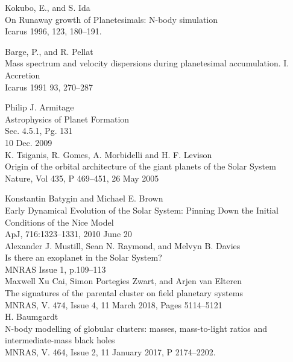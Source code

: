 \documentclass[a4paper,10pt]{article}
\begin{document}
\begin{thebibliography}{9}

Kokubo, E., and S. Ida\\
On Runaway growth of Planetesimals: N-body simulation\\ 
Icarus 1996, 123, 180--191.

Barge, P., and R. Pellat\\ 
Mass spectrum and velocity dispersions during planetesimal accumulation. I. Accretion\\
Icarus 1991 93, 270--287

Philip J. Armitage\\
Astrophysics of Planet Formation\\
Sec. 4.5.1, Pg. 131\\
10 Dec. 2009\\

K. Tsiganis, R. Gomes, A. Morbidelli and H. F. Levison\\
Origin of the orbital architecture of the giant planets of the Solar System\\ 
Nature, Vol 435, P 469--451, 26 May 2005

Konstantin Batygin and Michael E. Brown\\
Early Dynamical Evolution of the Solar System: Pinning Down the Initial Conditions of the Nice Model\\
 ApJ, 716:1323--1331, 2010 June 20\\

Alexander J. Mustill, Sean N. Raymond, and Melvyn B. Davies\\
Is there an exoplanet in the Solar System?\\
MNRAS Issue 1, p.109--113\\

Maxwell Xu Cai, Simon Portegies Zwart, and Arjen van Elteren\\ 
The signatures of the parental cluster on field planetary systems\\
MNRAS, V. 474, Issue 4, 11 March 2018, Pages 5114--5121\\

H. Baumgardt\\
N-body modelling of globular clusters: masses, mass-to-light ratios and intermediate-mass black holes\\
MNRAS, V. 464, Issue 2, 11 January 2017, P 2174--2202.


\end{thebibliography}
\end{document}
